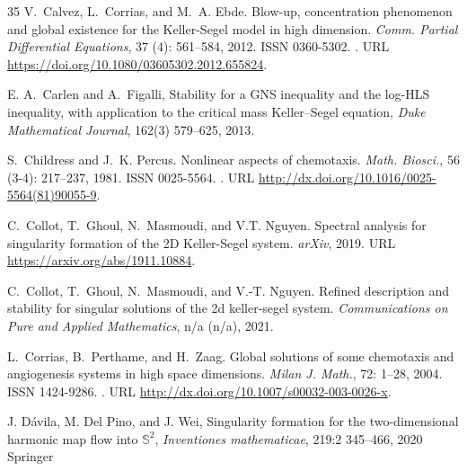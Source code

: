 \documentclass[11pt]{aims}
\theoremstyle{definition}
\numberwithin{equation}{section}
\begin{document}
\begin{thebibliography}{35}
V.~Calvez, L.~Corrias, and M.~A. Ebde.
\newblock Blow-up, concentration phenomenon and global existence for the
  {K}eller-{S}egel model in high dimension.
\newblock \emph{Comm. Partial Differential Equations}, 37
  (4): 561--584, 2012.
\newblock ISSN 0360-5302.
\newblock {}.
\newblock URL \url{https://doi.org/10.1080/03605302.2012.655824}.

E. A.~Carlen and A.~Figalli,
\newblock Stability for a GNS inequality and the log-HLS inequality, with application to the critical mass Keller--Segel equation,
\newblock \emph{Duke Mathematical Journal}, 162(3) 579--625, 2013.


S.~Childress and J.~K. Percus.
\newblock Nonlinear aspects of chemotaxis.
\newblock \emph{Math. Biosci.}, 56 (3-4): 217--237, 1981.
\newblock ISSN 0025-5564.
\newblock {}.
\newblock URL \url{http://dx.doi.org/10.1016/0025-5564(81)90055-9}.

C.~Collot, T.~Ghoul, N.~Masmoudi, and V.T. Nguyen.
\newblock Spectral analysis for singularity formation of the {2D Keller-Segel}
  system.
\newblock \emph{arXiv}, 2019.
\newblock URL \url{https://arxiv.org/abs/1911.10884}.

C.~Collot, T.~Ghoul, N.~Masmoudi, and V.-T. Nguyen.
\newblock Refined description and stability for singular solutions of the 2d
  keller-segel system.
\newblock \emph{Communications on Pure and Applied Mathematics}, n/a
  (n/a), 2021.

L.~Corrias, B.~Perthame, and H.~Zaag.
\newblock Global solutions of some chemotaxis and angiogenesis systems in high
  space dimensions.
\newblock \emph{Milan J. Math.}, 72: 1--28, 2004.
\newblock ISSN 1424-9286.
\newblock {}.
\newblock URL \url{http://dx.doi.org/10.1007/s00032-003-0026-x}.

J. D{\'a}vila, M. Del Pino, and J. Wei,
\newblock Singularity formation for the two-dimensional harmonic map flow into $\mathbb S^2$,
\newblock \emph{Inventiones mathematicae}, 219:2 345--466, 2020
\newblock Springer



\end{thebibliography}
\end{document}
